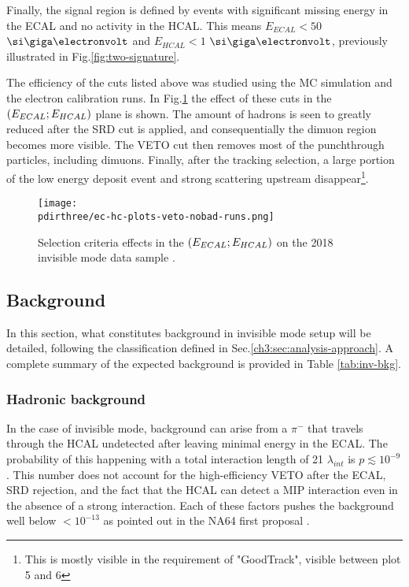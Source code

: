 Finally, the signal region is defined by events with significant missing energy in the ECAL and no activity in the HCAL. This means $E_{ECAL} < 50$ $\gev$ and $E_{HCAL} < 1$ $\gev$, previously illustrated in Fig.\ref{fig:two-signature}.

The efficiency of the cuts listed above was studied using the MC simulation and the electron calibration runs.
In Fig.\ref{fig:inv-cut-ehcal} the effect of these cuts in the $(E_{ECAL};E_{HCAL})$ plane is shown.
The amount of hadrons is seen to greatly reduced after the SRD cut is applied, and consequentially the dimuon region becomes more visible. The VETO cut then removes most of the punchthrough particles, including dimuons. Finally, after the tracking selection, a large portion of the low energy deposit event and strong scattering upstream disappear\footnote{This is mostly visible in the requirement of "GoodTrack", visible between plot 5 and 6}.


\begin{figure}[bth!]
  \centering
   \texttt{[image: \\pdirthree/ec-hc-plots-veto-nobad-runs.png]}
  \caption[Effect of the cuts in invisible mode]{Selection criteria effects in the $(E_{ECAL};E_{HCAL})$ on the 2018 invisible mode data sample \cite{invis-cut-plot,NA64:2019imj}.}
  \label{fig:inv-cut-ehcal}
\end{figure}

\subsection{Background}
\label{ch3:sec:bkg:inv}

In this section, what constitutes background in invisible mode setup will be detailed, following the classification defined in Sec.\ref{ch3:sec:analysis-approach}. A complete summary of the expected background is provided in Table \ref{tab:inv-bkg}.
\subsubsection{Hadronic background}
\label{ch3:sec:bkg:inv:hadr}


In the case of invisible mode, background can arise from a $\pi^-$ that travels through the HCAL undetected after leaving minimal energy in the ECAL. The probability of this happening with a total interaction length of 21 $\lambda_{int}$ is $p\lesssim 10^{-9}$. This number does not account for the high-efficiency VETO after the ECAL, SRD rejection, and the fact that the HCAL can detect a MIP interaction even in the absence of a strong interaction. Each of these factors pushes the background well below $<10^{-13}$ as pointed out in the NA64 first proposal \cite{Andreas:2013lya}.

